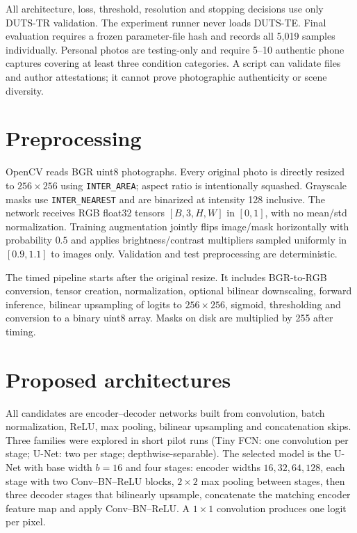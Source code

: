 \documentclass[11pt,a4paper]{article}
\begin{document}
All architecture, loss, threshold, resolution and stopping decisions use only DUTS-TR validation. The experiment runner never loads DUTS-TE. Final evaluation requires a frozen parameter-file hash and records all 5,019 samples individually. Personal photos are testing-only and require 5--10 authentic phone captures covering at least three condition categories. A script can validate files and author attestations; it cannot prove photographic authenticity or scene diversity.

\section{Preprocessing}
OpenCV reads BGR uint8 photographs. Every original photo is directly resized to $256\times256$ using \texttt{INTER\_AREA}; aspect ratio is intentionally squashed. Grayscale masks use \texttt{INTER\_NEAREST} and are binarized at intensity 128 inclusive. The network receives RGB float32 tensors $[B,3,H,W]$ in $[0,1]$, with no mean/std normalization. Training augmentation jointly flips image/mask horizontally with probability $0.5$ and applies brightness/contrast multipliers sampled uniformly in $[0.9,1.1]$ to images only. Validation and test preprocessing are deterministic.

The timed pipeline starts after the original resize. It includes BGR-to-RGB conversion, tensor creation, normalization, optional bilinear downscaling, forward inference, bilinear upsampling of logits to $256\times256$, sigmoid, thresholding and conversion to a binary uint8 array. Masks on disk are multiplied by 255 after timing.

\section{Proposed architectures}
All candidates are encoder--decoder networks built from convolution, batch normalization, ReLU, max pooling, bilinear upsampling and concatenation skips. Three families were explored in short pilot runs (Tiny FCN: one convolution per stage; U-Net: two per stage; depthwise-separable). The selected model is the U-Net with base width $b=16$ and four stages: encoder widths $16,32,64,128$, each stage with two Conv--BN--ReLU blocks, $2\times2$ max pooling between stages, then three decoder stages that bilinearly upsample, concatenate the matching encoder feature map and apply Conv--BN--ReLU. A $1\times1$ convolution produces one logit per pixel.
\end{document}
